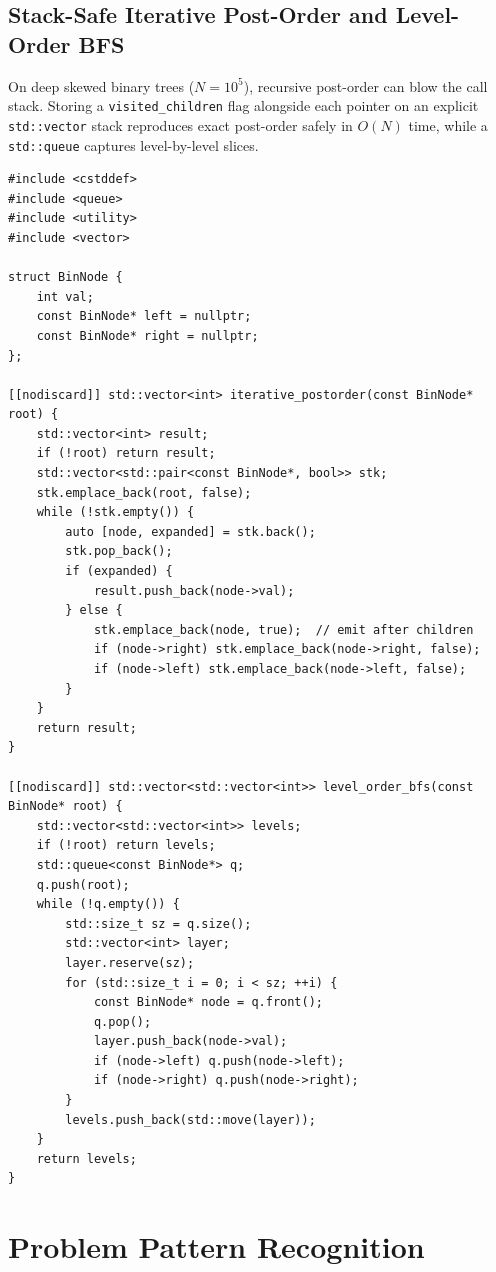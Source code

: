 \documentclass[11pt,a4paper]{article}
\theoremstyle{definition}
\begin{document}
\subsection{Stack-Safe Iterative Post-Order and Level-Order BFS}

On deep skewed binary trees ($N = 10^5$), recursive post-order can blow the call stack. Storing a \texttt{visited\_children} flag alongside each pointer on an explicit \texttt{std::vector} stack reproduces exact post-order safely in $O(N)$ time, while a \texttt{std::queue} captures level-by-level slices.

\begin{lstlisting}[caption={Iterative post-order traversal and grouped level-order BFS for binary trees.}]
#include <cstddef>
#include <queue>
#include <utility>
#include <vector>

struct BinNode {
    int val;
    const BinNode* left = nullptr;
    const BinNode* right = nullptr;
};

[[nodiscard]] std::vector<int> iterative_postorder(const BinNode* root) {
    std::vector<int> result;
    if (!root) return result;
    std::vector<std::pair<const BinNode*, bool>> stk;
    stk.emplace_back(root, false);
    while (!stk.empty()) {
        auto [node, expanded] = stk.back();
        stk.pop_back();
        if (expanded) {
            result.push_back(node->val);
        } else {
            stk.emplace_back(node, true);  // emit after children
            if (node->right) stk.emplace_back(node->right, false);
            if (node->left) stk.emplace_back(node->left, false);
        }
    }
    return result;
}

[[nodiscard]] std::vector<std::vector<int>> level_order_bfs(const BinNode* root) {
    std::vector<std::vector<int>> levels;
    if (!root) return levels;
    std::queue<const BinNode*> q;
    q.push(root);
    while (!q.empty()) {
        std::size_t sz = q.size();
        std::vector<int> layer;
        layer.reserve(sz);
        for (std::size_t i = 0; i < sz; ++i) {
            const BinNode* node = q.front();
            q.pop();
            layer.push_back(node->val);
            if (node->left) q.push(node->left);
            if (node->right) q.push(node->right);
        }
        levels.push_back(std::move(layer));
    }
    return levels;
}
\end{lstlisting}

\section{Problem Pattern Recognition}
\label{sec:patterns}
\end{document}
